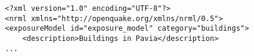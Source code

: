 \begin{lstlisting}[language=NRML]
<?xml version="1.0" encoding="UTF-8"?>
<nrml xmlns="http://openquake.org/xmlns/nrml/0.5">
<exposureModel id="exposure_model" category="buildings">
	<description>Buildings in Pavia</description>
...
\end{lstlisting}